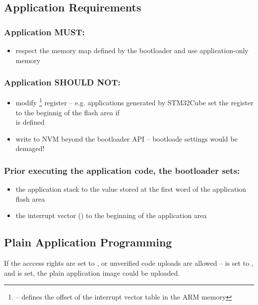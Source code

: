\subsection{Application Requirements}
\subsubsection*{Application MUST:}
\begin{itemize}
  \item respect the memory map defined by the bootloader and use application-only memory
\end{itemize}

\subsubsection*{Application SHOULD NOT:}
\begin{itemize}
  \item modify \footnote{ -- defines the offset of the interrupt vector table in the ARM memory} register -- e.g. applications generated by STM32Cube set the  register to the beginnig of the flash area if\\ is defined
  \item write to NVM beyond the bootloader API -- bootloade settings would be demaged!
\end{itemize}

\subsubsection*{Prior executing the application code, the bootloader sets:}
\begin{itemize}
  \item the application stack to the value stored at the first word of the application flash area
  \item the interrupt vector () to the beginning of the application area
\end{itemize}

\clearpage
\subsection{Plain Application Programming}\label{sec:app:prog}
If the acccess rights are set to , or unverified code uploads are allowed --  is set to , and  is set, the plain application image could be uploaded.

